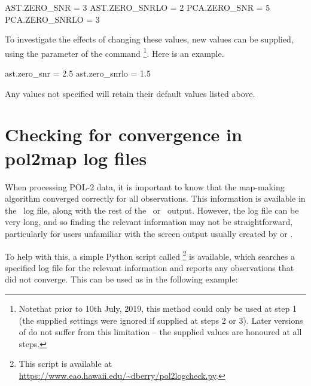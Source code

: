 \begin{terminalv}
AST.ZERO_SNR = 3 
AST.ZERO_SNRLO = 2 
PCA.ZERO_SNR = 5 
PCA.ZERO_SNRLO = 3
\end{terminalv}

To investigate the effects of changing these values, new values can be supplied, using the 
 parameter of the  command \footnote{Notethat prior to 10th July, 2019, this method could only be used at step 1 (the supplied settings were ignored if supplied at steps 2 or 3). Later versions of  do not suffer from this limitation -- the supplied values are honoured at all steps.}.  Here is an example.

\begin{terminalv}
ast.zero_snr = 2.5
ast.zero_snrlo = 1.5
\end{terminalv}

Any values not specified will retain their default values listed above.


\section{Checking for convergence in pol2map log files}

When processing POL-2 data, it is important to know that the map-making algorithm converged 
correctly for all observations. This information is available in the \poltwomap\ log file, along with 
the rest of the \makemap\ or \skyloop\ output.  However, the log file can be very long, and 
so finding the relevant information may not be straightforward, particularly for users unfamiliar 
with the screen output usually created by  or .

To help with this, a simple Python script called \footnote{This script is available at \url{https://www.eao.hawaii.edu/~dberry/pol2logcheck.py}.} is available, which searches a specified  log file for the relevant information and reports any observations that did not converge. This can be used as in the following example:



